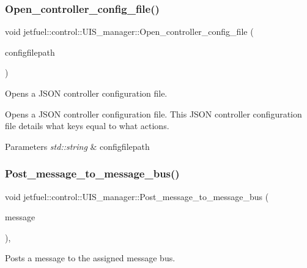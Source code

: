 \subsubsection{\texorpdfstring{Open\+\_\+controller\+\_\+config\+\_\+file()}{Open\_controller\_config\_file()}}
{\footnotesize\ttfamily void jetfuel\+::control\+::\+U\+I\+S\+\_\+manager\+::\+Open\+\_\+controller\+\_\+config\+\_\+file (\begin{DoxyParamCaption}\item[{const std\+::string}]{configfilepath }\end{DoxyParamCaption})}



Opens a J\+S\+ON controller configuration file. 

Opens a J\+S\+ON controller configuration file. This J\+S\+ON controller configuration file details what keys equal to what actions.


\begin{DoxyParams}{Parameters}
{\em std\+::string} & configfilepath \\
\hline
\end{DoxyParams}
\mbox{\label{classjetfuel_1_1control_1_1UIS__manager_a1550f61f5aabf96baa3ea4dc9ccb0988}} 
\subsubsection{\texorpdfstring{Post\+\_\+message\+\_\+to\+\_\+message\+\_\+bus()}{Post\_message\_to\_message\_bus()}}
{\footnotesize\ttfamily void jetfuel\+::control\+::\+U\+I\+S\+\_\+manager\+::\+Post\+\_\+message\+\_\+to\+\_\+message\+\_\+bus (\begin{DoxyParamCaption}\item[{const std\+::string}]{message }\end{DoxyParamCaption})\hspace{0.3cm}{\ttfamily [inline]}, {\ttfamily [protected]}}



Posts a message to the assigned message bus. 

